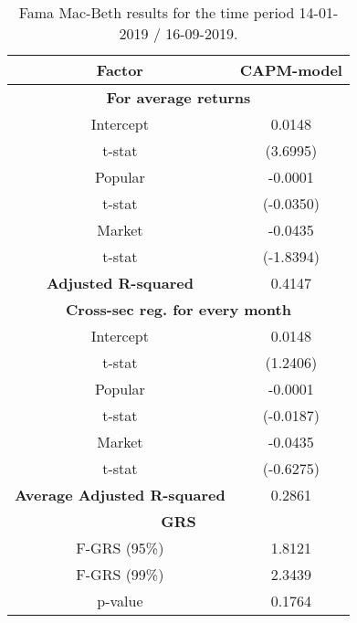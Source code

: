 \begin{table}[h!]
	\centering
	\captionsetup{skip=0.5\baselineskip}
	\caption{Fama Mac-Beth results for the time period 14-01-2019 / 16-09-2019.}
	\begin{tabular}{|c|c|}
		\hline
		\textbf{Factor} & \textbf{CAPM-model} \\ \hline
		\multicolumn{2}{|c|}{\textbf{For average returns}} \\ \hline
		Intercept & 0.0148 \\ 
		t-stat & (3.6995) \\ \hline
		Popular & -0.0001 \\ 
		t-stat & (-0.0350)\\ \hline
		Market & -0.0435 \\
		t-stat & (-1.8394)\\ \hline
		\textbf{Adjusted R-squared} & 0.4147 \\ \hline
		\multicolumn{2}{|c|}{\textbf{Cross-sec reg. for every month}} \\ \hline
		Intercept & 0.0148 \\ 
		t-stat & (1.2406) \\ \hline
		Popular & -0.0001 \\ 
		t-stat & (-0.0187)\\ \hline
		Market & -0.0435 \\
		t-stat & (-0.6275)\\ \hline
		\textbf{Average Adjusted R-squared} & 0.2861 \\ \hline
		\multicolumn{2}{|c|}{\textbf{GRS}} \\ \hline
		F-GRS (95\%) & 1.8121 \\ \hline
		F-GRS (99\%) & 2.3439 \\ \hline
		p-value & 0.1764 \\ \hline
	\end{tabular}
\end{table}

